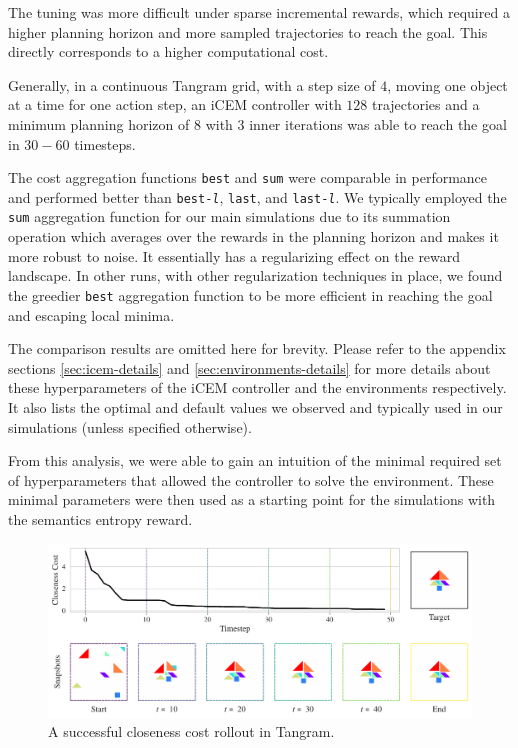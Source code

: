 The tuning was more difficult under sparse incremental rewards, which required a higher planning horizon and more sampled trajectories to reach the goal.
This directly corresponds to a higher computational cost.

Generally, in a continuous Tangram grid, with a step size of \(4\), moving one object at a time for one action step, an iCEM controller with \(128\) trajectories and a minimum planning horizon of \(8\) with \(3\) inner iterations was able to reach the goal in \(30-60\) timesteps.

The cost aggregation functions \texttt{best} and \texttt{sum} were comparable in performance and performed better than \texttt{best-\emph{l}}, \texttt{last}, and \texttt{last-\emph{l}}.
We typically employed the \texttt{sum} aggregation function for our main simulations due to its summation operation which averages over the rewards in the planning horizon and makes it more robust to noise.
It essentially has a regularizing effect on the reward landscape.
In other runs, with other regularization techniques in place, we found the greedier \texttt{best} aggregation function to be more efficient in reaching the goal and escaping local minima.

The comparison results are omitted here for brevity. Please refer to the appendix sections \ref{sec:icem-details} and \ref{sec:environments-details} for more details about these hyperparameters of the iCEM controller and the environments respectively. It also lists the optimal and default values we observed and typically used in our simulations (unless specified otherwise).

From this analysis, we were able to gain an intuition of the minimal required set of hyperparameters that allowed the controller to solve the environment.
These minimal parameters were then used as a starting point for the simulations with the semantics entropy reward.

\begin{figure}[H]
    \centering
    \includegraphics[width=\textwidth]{images/closeness_trajectory_495.pdf}
    \caption{A successful closeness cost rollout in Tangram.}
    \label{fig:closeness-rollouts}
\end{figure}


